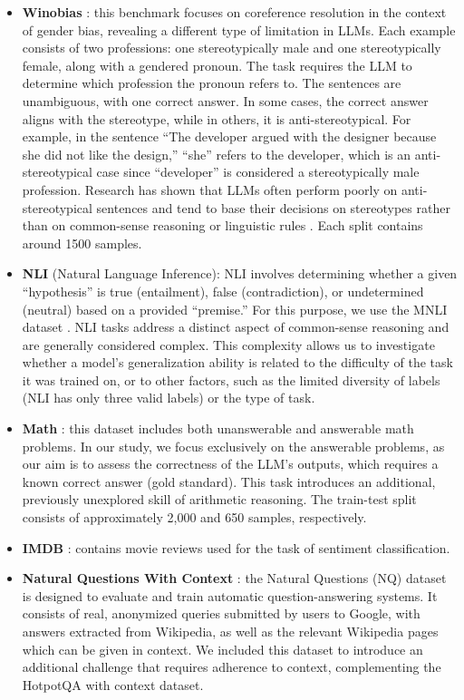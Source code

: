 \documentclass{article} %
\begin{document}
\begin{itemize}
    \item \textbf{Winobias} \citep{zhao2018gender}: this benchmark focuses on coreference resolution in the context of gender bias, revealing a different type of limitation in LLMs. Each example consists of two professions: one stereotypically male and one stereotypically female, along with a gendered pronoun. The task requires the LLM to determine which profession the pronoun refers to. The sentences are unambiguous, with one correct answer. In some cases, the correct answer aligns with the stereotype, while in others, it is anti-stereotypical. For example, in the sentence ``The developer argued with the designer because she did not like the design,'' ``she'' refers to the developer, which is an anti-stereotypical case since ``developer'' is considered a stereotypically male profession. Research has shown that LLMs often perform poorly on anti-stereotypical sentences \citep{zhao2018gender} and tend to base their decisions on stereotypes rather than on common-sense reasoning or linguistic rules \citep{kotek2023gender}.
    Each split contains around 1500 samples.
    \item \textbf{NLI} (Natural Language Inference): NLI involves determining whether a given ``hypothesis'' is true (entailment), false (contradiction), or undetermined (neutral) based on a provided ``premise.'' For this purpose, we use the MNLI dataset \citep{mnli}. NLI tasks address a distinct aspect of common-sense reasoning and are generally considered complex. This complexity allows us to investigate whether a model's generalization ability is related to the difficulty of the task it was trained on, or to other factors, such as the limited diversity of labels (NLI has only three valid labels) or the type of task.
    \item \textbf{Math} \citep{sun2024benchmarking}: this dataset includes both unanswerable and answerable math problems. In our study, we focus exclusively on the answerable problems, as our aim is to assess the correctness of the LLM's outputs, which requires a known correct answer (gold standard). This task introduces an additional, previously unexplored skill of arithmetic reasoning. 
    The train-test split consists of approximately 2,000 and 650 samples, respectively. 
    \item \textbf{IMDB} \citep{imdb_dataset}: contains movie reviews used for the task of sentiment classification.
    \item \textbf{Natural Questions With Context} \citep{natural_qurstions}: the Natural Questions (NQ) dataset is designed to evaluate and train automatic question-answering systems.
    It consists of real, anonymized queries submitted by users to Google, with answers extracted from Wikipedia, as well as the relevant Wikipedia pages which can be given in context. 
    We included this dataset to introduce an additional challenge that requires adherence to context, complementing the HotpotQA with context dataset.
\end{itemize}
\end{document}
